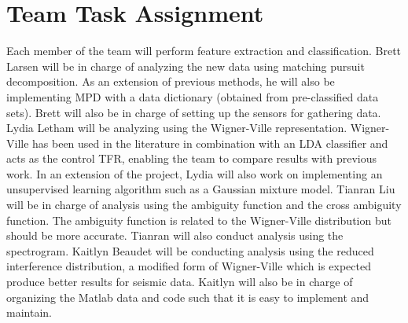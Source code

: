 \documentclass{article}[11pt]
\begin{document}
\section{Team Task Assignment}
\label{sec:assignments}
Each member of the team will perform feature extraction and classification.  Brett Larsen will be in charge of analyzing the new data using matching pursuit decomposition.  As an extension of previous methods, he will also be implementing MPD with a data dictionary (obtained from pre-classified data sets).  Brett will also be in charge of setting up the sensors for gathering data.  Lydia Letham will be analyzing using the Wigner-Ville representation.  Wigner-Ville has been used in the literature in combination with an LDA classifier and acts as the control TFR, enabling the team to compare results with previous work. In an extension of the project, Lydia will also work on implementing an unsupervised learning algorithm such as a Gaussian mixture model.  Tianran Liu will be in charge of analysis using the ambiguity function and the cross ambiguity function.  The ambiguity function is related to the Wigner-Ville distribution but should be more accurate. Tianran will also conduct analysis using the spectrogram.  Kaitlyn Beaudet will be conducting analysis using the reduced interference distribution, a modified form of Wigner-Ville which is expected produce better results for seismic data. Kaitlyn will also be in charge of organizing the Matlab data and code such that it is easy to implement and maintain.



\end{document}
